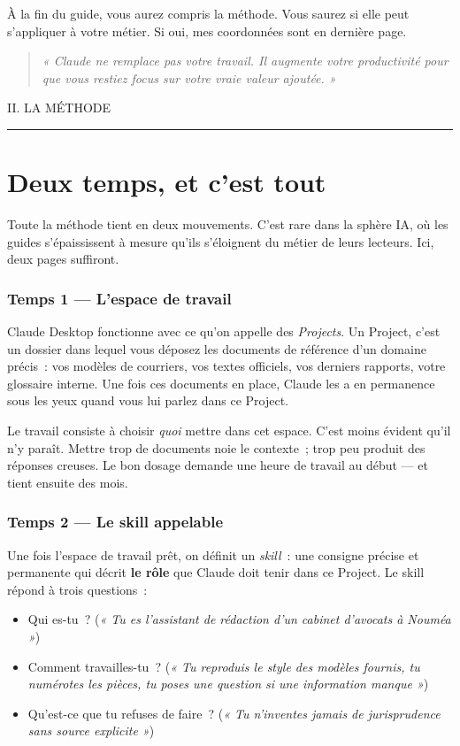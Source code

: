 \documentclass[11pt,a4paper]{article}
\newcommand{\dateline}[1]{{\footnotesize\ttfamily\color{encrefaint}\MakeUppercase{#1}}}
\newcommand{\bordsec}[1]{\subsubsection*{\textcolor{bordeaux}{#1}}}
\newcommand{\pullquote}[1]{%
  \begin{quote}\itshape\color{encre}\large #1\end{quote}%
}
\begin{document}
À la fin du guide, vous aurez compris la méthode. Vous saurez si elle peut
s'appliquer à votre métier. Si oui, mes coordonnées sont en dernière page.

\pullquote{« Claude ne remplace pas votre travail. Il augmente votre productivité
pour que vous restiez focus sur votre vraie valeur ajoutée. »}

\newpage


\dateline{II. \quad La méthode}

\vspace{0.4cm}
{\color{encre}\rule{\linewidth}{0.4pt}}
\vspace{1cm}

\section*{Deux temps, et c'est tout}

Toute la méthode tient en deux mouvements. C'est rare dans la sphère IA, où
les guides s'épaississent à mesure qu'ils s'éloignent du métier de leurs
lecteurs. Ici, deux pages suffiront.

\bordsec{Temps 1 — L'espace de travail}

Claude Desktop fonctionne avec ce qu'on appelle des \textit{Projects}.
Un Project, c'est un dossier dans lequel vous déposez les documents de
référence d'un domaine précis~: vos modèles de courriers, vos textes officiels,
vos derniers rapports, votre glossaire interne. Une fois ces documents
en place, Claude les a en permanence sous les yeux quand vous lui parlez
dans ce Project.

Le travail consiste à choisir \textit{quoi} mettre dans cet espace.
C'est moins évident qu'il n'y paraît. Mettre trop de documents noie le
contexte~; trop peu produit des réponses creuses. Le bon dosage demande
une heure de travail au début — et tient ensuite des mois.

\bordsec{Temps 2 — Le skill appelable}

Une fois l'espace de travail prêt, on définit un \textit{skill}~: une
consigne précise et permanente qui décrit \textbf{le rôle} que Claude doit
tenir dans ce Project. Le skill répond à trois questions~:

\begin{itemize}
  \item Qui es-tu~? (\textit{« Tu es l'assistant de rédaction d'un cabinet d'avocats à Nouméa »})
  \item Comment travailles-tu~? (\textit{« Tu reproduis le style des modèles fournis, tu numérotes les pièces, tu poses une question si une information manque »})
  \item Qu'est-ce que tu refuses de faire~? (\textit{« Tu n'inventes jamais de jurisprudence sans source explicite »})
\end{itemize}
\end{document}
